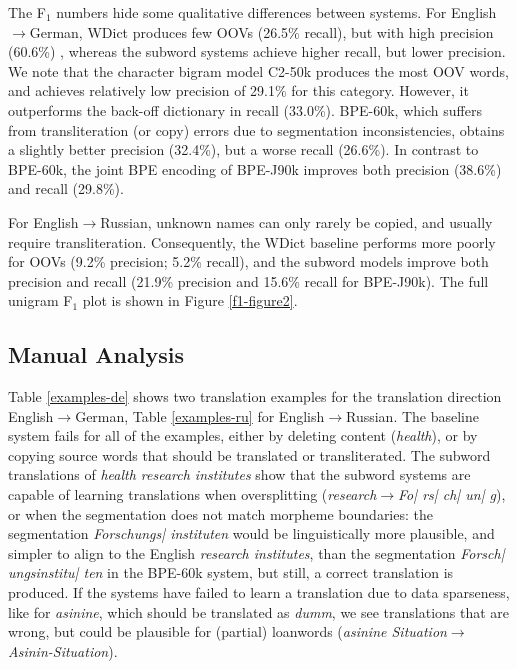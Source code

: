 The F$_1$ numbers hide some qualitative differences between systems. For English$\to$German, WDict produces few OOVs (26.5\% recall), but with high precision (60.6\%) , whereas the subword systems achieve higher recall, but lower precision. We note that the character bigram model C2-50k produces the most OOV words, and achieves relatively low precision of 29.1\% for this category. However, it outperforms the back-off dictionary in recall (33.0\%).
BPE-60k, which suffers from transliteration (or copy) errors due to segmentation inconsistencies, obtains a slightly better precision (32.4\%), but a worse recall (26.6\%).
In contrast to BPE-60k, the joint BPE encoding of BPE-J90k improves both precision (38.6\%) and recall (29.8\%).

For English$\to$Russian, unknown names can only rarely be copied, and usually require transliteration. Consequently, the WDict baseline performs more poorly for OOVs (9.2\% precision; 5.2\% recall), and the subword models improve both precision and recall (21.9\% precision and 15.6\% recall for BPE-J90k). The full unigram F$_1$ plot is shown in Figure \ref{f1-figure2}.

\subsection{Manual Analysis}

Table \ref{examples-de} shows two translation examples for the translation direction English$\to$German,
Table \ref{examples-ru} for English$\to$Russian.
The baseline system fails for all of the examples, either by deleting content (\emph{health}), or by copying source words that should be translated or transliterated. The subword translations of \emph{health research institutes} show that the subword systems are capable of learning translations when oversplitting (\emph{research}$\rightarrow$\emph{Fo{\color{gray}|} rs{\color{gray}|} ch{\color{gray}|} un{\color{gray}|} g}), or when the segmentation does not match morpheme boundaries: the segmentation \emph{Forschungs{\color{gray}|} instituten} would be linguistically more plausible, and simpler to align to the English \emph{research institutes}, than the segmentation \emph{Forsch{\color{gray}|} ungsinstitu{\color{gray}|} ten} in the BPE-60k system, but still, a correct translation is produced. If the systems have failed to learn a translation due to data sparseness, like for \emph{asinine}, which should be translated as \emph{dumm}, we see translations that are wrong, but could be plausible for (partial) loanwords (\emph{asinine Situation}$\rightarrow$\emph{Asinin-Situation}).

